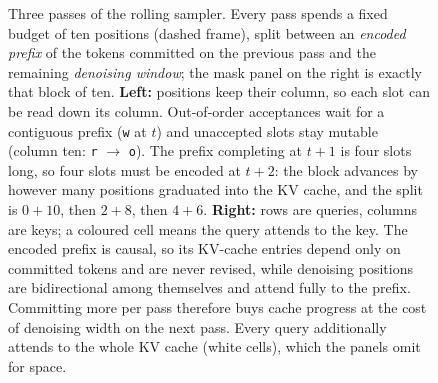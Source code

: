 \begin{figure}[tbp]
\begin{tikzpicture}[x=0.36cm, y=0.36cm]
\end{tikzpicture}
\caption{Three passes of the rolling sampler.  Every pass spends a fixed
budget of ten positions (dashed frame), split between an \emph{encoded
prefix} of the tokens committed on the previous pass and the remaining
\emph{denoising window}; the mask panel on the right is exactly that block of
ten.  \textbf{Left:} positions keep their column, so each slot can be read down
its column.  Out-of-order acceptances wait for a contiguous prefix (\texttt{w}
at $t$) and unaccepted slots stay mutable (column ten: \texttt{r} $\to$
\texttt{o}).  The prefix completing at $t{+}1$ is four slots long, so four
slots must be encoded at $t{+}2$: the block advances by however many positions
graduated into the KV cache, and the split is $0{+}10$, then $2{+}8$, then
$4{+}6$.  \textbf{Right:} rows are queries, columns are keys; a coloured cell
means the query attends to the key.  The encoded prefix is causal, so its
KV-cache entries depend only on committed tokens and are never revised, while
denoising positions are bidirectional among themselves and attend fully to the
prefix.  Committing more per pass therefore buys cache progress at the cost of
denoising width on the next pass.  Every query additionally attends to the
whole KV cache (white cells), which the panels omit for space.}
\label{fig:algorithm-concept}
\end{figure}